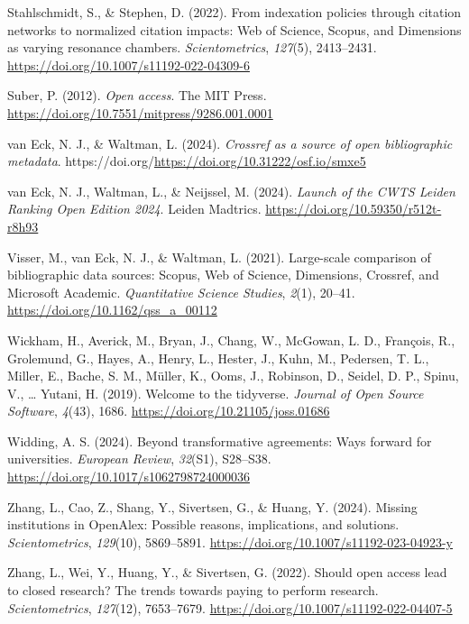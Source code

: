 \documentclass[a4paper,man,floatsintext,longtable,noextraspace,10pt]{apa6}
\newlength{\cslhangindent}
\newenvironment{CSLReferences}[2] %
{\begin{list}{}{%
  \setlength{\itemindent}{0pt}
  \setlength{\leftmargin}{0pt}
  \setlength{\parsep}{0pt}
  \ifodd #1
  \setlength{\leftmargin}{\cslhangindent}
  \setlength{\itemindent}{-1\cslhangindent}
  \fi
  \setlength{\itemsep}{#2\baselineskip}}}
{\end{list}}
\begin{document}
\begin{CSLReferences}{1}{0}
Stahlschmidt, S., \& Stephen, D. (2022). From indexation policies
through citation networks to normalized citation impacts: {Web of
Science}, {Scopus}, and {Dimensions} as varying resonance chambers.
\emph{Scientometrics}, \emph{127}(5), 2413--2431.
\url{https://doi.org/10.1007/s11192-022-04309-6}

Suber, P. (2012). \emph{Open access}. The MIT Press.
\url{https://doi.org/10.7551/mitpress/9286.001.0001}

van Eck, N. J., \& Waltman, L. (2024). \emph{Crossref as a source of
open bibliographic metadata}.
https://doi.org/\url{https://doi.org/10.31222/osf.io/smxe5}

van Eck, N. J., Waltman, L., \& Neijssel, M. (2024). \emph{{Launch of
the CWTS Leiden Ranking Open Edition 2024}}. Leiden Madtrics.
\url{https://doi.org/10.59350/r512t-r8h93}

Visser, M., van Eck, N. J., \& Waltman, L. (2021). Large-scale
comparison of bibliographic data sources: {Scopus, Web of Science,
Dimensions, Crossref, and Microsoft Academic}. \emph{Quantitative
Science Studies}, \emph{2}(1), 20--41.
\url{https://doi.org/10.1162/qss_a_00112}

Wickham, H., Averick, M., Bryan, J., Chang, W., McGowan, L. D.,
François, R., Grolemund, G., Hayes, A., Henry, L., Hester, J., Kuhn, M.,
Pedersen, T. L., Miller, E., Bache, S. M., Müller, K., Ooms, J.,
Robinson, D., Seidel, D. P., Spinu, V., \ldots{} Yutani, H. (2019).
Welcome to the {tidyverse}. \emph{Journal of Open Source Software},
\emph{4}(43), 1686. \url{https://doi.org/10.21105/joss.01686}

Widding, A. S. (2024). Beyond transformative agreements: Ways forward
for universities. \emph{European Review}, \emph{32}(S1), S28--S38.
\url{https://doi.org/10.1017/s1062798724000036}

Zhang, L., Cao, Z., Shang, Y., Sivertsen, G., \& Huang, Y. (2024).
Missing institutions in OpenAlex: Possible reasons, implications, and
solutions. \emph{Scientometrics}, \emph{129}(10), 5869--5891.
\url{https://doi.org/10.1007/s11192-023-04923-y}

Zhang, L., Wei, Y., Huang, Y., \& Sivertsen, G. (2022). Should open
access lead to closed research? The trends towards paying to perform
research. \emph{Scientometrics}, \emph{127}(12), 7653--7679.
\url{https://doi.org/10.1007/s11192-022-04407-5}

\end{CSLReferences}
\end{document}
